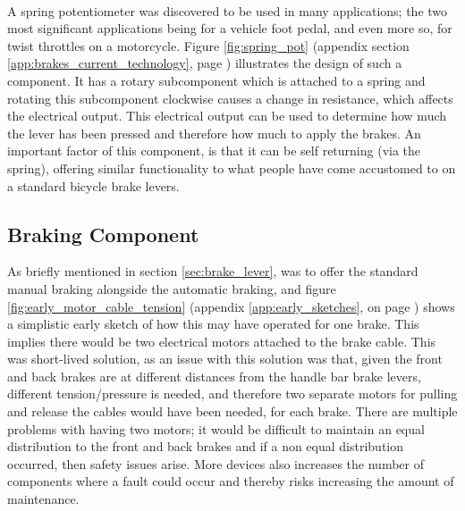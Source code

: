 \documentclass[a4paper]{report}
\begin{document}
{\paragraph{}A spring potentiometer was discovered to be used in many applications; the two most significant applications being for a vehicle foot pedal, and even more so, for twist throttles on a motorcycle. Figure \ref{fig:spring_pot} (appendix section \ref{app:brakes_current_technology}, page \pageref{fig:spring_pot}) illustrates the design of such a component. It has a rotary subcomponent which is attached to a spring and rotating this subcomponent clockwise causes a change in resistance, which affects the electrical output. This electrical output can be used to determine how much the lever has been pressed and therefore how much to apply the brakes. An important factor of this component, is that it can be self returning (via the spring), offering similar functionality to what people have come accustomed to on a standard bicycle brake levers.


\subsection{Braking Component}
\label{sec:braking_component}

As briefly mentioned in section \ref{sec:brake_lever}, was to offer the standard manual braking alongside the automatic braking, and figure \ref{fig:early_motor_cable_tension} (appendix \ref{app:early_sketches}, on page \pageref{fig:early_motor_cable_tension}) shows a simplistic early sketch of how this may have operated for one brake. This implies there would be two electrical motors attached to the brake cable. This was short-lived solution, as an issue with this solution was that, given the front and back brakes are at different distances from the handle bar brake levers, different tension/pressure is needed, and therefore two separate motors for pulling and release the cables would have been needed, for each brake. There are multiple problems with having two motors; it would be difficult to maintain an equal distribution to the front and back brakes and if a non equal distribution occurred, then safety issues arise. More devices also increases the number of components where a fault could occur and thereby risks increasing the amount of maintenance.  

}
\end{document}

